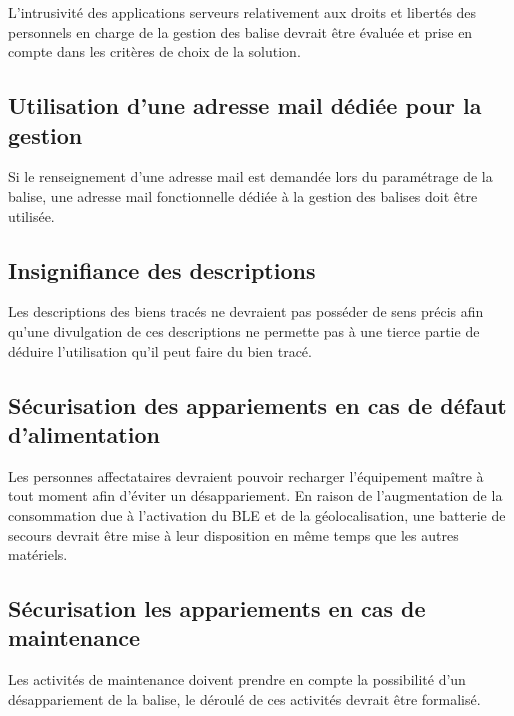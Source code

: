 \documentclass[headings=small,cmyk,french,a4paper,twocolumn,garamond,11pt]{scrartcl}
\begin{document}
L'intrusivité des applications serveurs relativement aux droits et
libertés des personnels en charge de la gestion des balise devrait
être évaluée et prise en compte dans les critères de choix de la
solution.
\subsection{Utilisation d'une adresse mail dédiée pour la gestion}

Si le renseignement d'une adresse mail est demandée lors du
paramétrage de la balise, une adresse mail fonctionnelle dédiée à la
gestion des balises doit être utilisée.

\subsection{Insignifiance des descriptions}

Les descriptions des biens tracés ne devraient pas posséder de sens
précis afin qu'une divulgation de ces descriptions ne permette pas à
une tierce partie de déduire l'utilisation qu'il peut faire du bien
tracé.

\subsection{Sécurisation des appariements en cas de défaut d'alimentation}

Les personnes affectataires devraient pouvoir recharger l'équipement
maître à tout moment afin d'éviter un désappariement. En raison de
l'augmentation de la consommation due à l'activation du \acrshort{BLE}
et de la géolocalisation, une batterie de secours devrait être mise à
leur disposition en même temps que les autres matériels.

\subsection{Sécurisation les appariements en cas de maintenance}

Les activités de maintenance doivent prendre en compte la possibilité
d'un désappariement de la balise, le déroulé de ces activités devrait
être formalisé.
\end{document}
